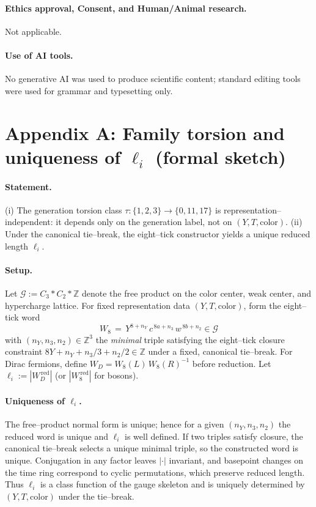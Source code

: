 \documentclass[epjc3]{svjour3}
\begin{document}
\paragraph{Ethics approval, Consent, and Human/Animal research.}
Not applicable.

\paragraph{Use of AI tools.}
No generative AI was used to produce scientific content; standard editing tools were used for grammar and typesetting only.

\appendix
\section*{Appendix A: Family torsion and uniqueness of $\ell_i$ (formal sketch)}
\paragraph{Statement.} (i) The generation torsion class $\tau:\{1,2,3\}\to\{0,11,17\}$ is representation–independent: it depends only on the generation label, not on $(Y,T,\text{color})$. (ii) Under the canonical tie–break, the eight–tick constructor yields a unique reduced length $\ell_i$.

\paragraph{Setup.} Let $\mathcal{G}:=C_3 * C_2 * \mathbb{Z}$ denote the free product on the color center, weak center, and hypercharge lattice. For fixed representation data $(Y,T,\text{color})$, form the eight–tick word
\[
  W_8 \,=\, Y^{8+n_Y}\,c^{\,8a+n_3}\,w^{\,8b+n_2}\in\mathcal{G}
\]
with $(n_Y,n_3,n_2)\in\mathbb{Z}^3$ the \emph{minimal} triple satisfying the eight–tick closure constraint $8Y + n_Y + n_3/3 + n_2/2\in\mathbb{Z}$ under a fixed, canonical tie–break. For Dirac fermions, define $W_{\!D}=W_8(L)\,W_8(R)^{-1}$ before reduction. Let $\ell_i:=|W_{\!D}^{\,\mathrm{red}}|$ (or $|W_8^{\,\mathrm{red}}|$ for bosons).

\paragraph{Uniqueness of $\ell_i$.} The free–product normal form is unique; hence for a given $(n_Y,n_3,n_2)$ the reduced word is unique and $\ell_i$ is well defined. If two triples satisfy closure, the canonical tie–break selects a unique minimal triple, so the constructed word is unique. Conjugation in any factor leaves $|\cdot|$ invariant, and basepoint changes on the time ring correspond to cyclic permutations, which preserve reduced length. Thus $\ell_i$ is a class function of the gauge skeleton and is uniquely determined by $(Y,T,\text{color})$ under the tie–break.
\end{document}
